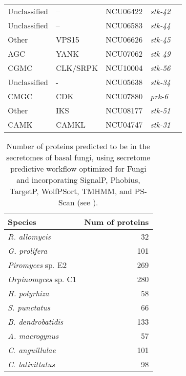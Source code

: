 \begin{table}[tbp]
\begin{tabular}{lllll}
  Unclassified & -- & NCU06422 & \emph{stk-42} \\ 
  Unclassified & -- & NCU06583 & \emph{stk-44} \\ 
  Other & VPS15 & NCU06626 & \emph{stk-45} \\ 
  AGC & YANK & NCU07062 & \emph{stk-49} \\ 
  CGMC & CLK/SRPK & NCU10004 & \emph{stk-56} \\ 
  Unclassified & - & NCU05638 & \emph{stk-34} \\ 
  CMGC & CDK & NCU07880 & \emph{prk-6} \\ 
  Other & IKS & NCU08177 & \emph{stk-51} \\ 
  CAMK & CAMKL & NCU04747 & \emph{stk-31} \\ 
   \hline
\end{tabular}
\end{table}

\begin{table}[tbp]
\caption[Chytrid secretome predictions]{Number of proteins predicted to be in the secretomes of basal fungi, using secretome predictive workflow optimized for Fungi and incorporating SignalP, Phobius, TargetP, WolfPSort, TMHMM, and PS-Scan (see \cite{Min2010}).} 
\label{tab:ChInhib_ChySec}
\begin{tabular}{lr}
  \hline
Species & Num of proteins \\ 
  \hline
\emph{R. allomycis} &  32 \\ 
  \emph{G. prolifera} & 101 \\ 
  \emph{Piromyces} sp. E2 & 269 \\ 
  \emph{Orpinomyces} sp. C1 & 280 \\ 
  \emph{H. polyrhiza} &  58 \\ 
  \emph{S. punctatus} &  66 \\ 
  \emph{B. dendrobatidis} & 133 \\ 
  \emph{A. macrogynus} &  57 \\ 
  \emph{C. anguillulae} & 101 \\ 
  \emph{C. lativittatus} &  98 \\ 
   \hline
\end{tabular}
\end{table}

